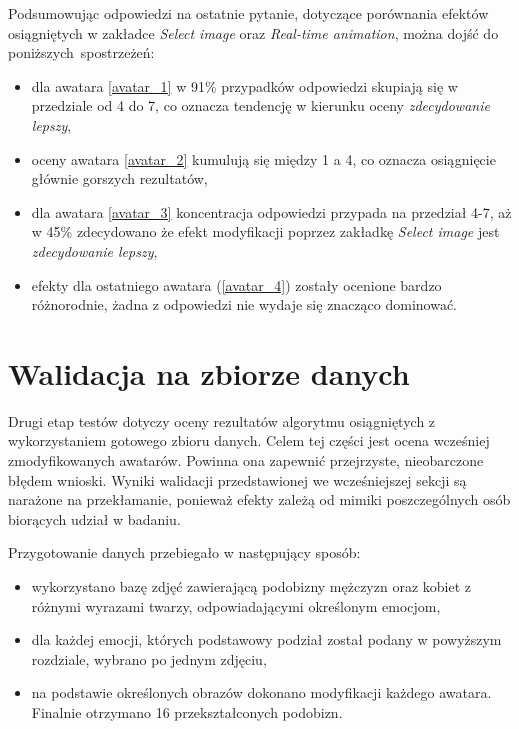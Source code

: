 Podsumowując odpowiedzi na ostatnie pytanie, dotyczące porównania efektów osiągniętych w zakładce \textit{Select image} oraz \textit{Real-time animation}, można dojść do poniższych~{spostrzeżeń}:
\begin{itemize}
    \item dla awatara \ref{avatar_1} w 91\% przypadków odpowiedzi skupiają się w przedziale od 4 do 7, co oznacza tendencję w kierunku oceny \textit{zdecydowanie lepszy},
    \item oceny awatara \ref{avatar_2} kumulują się między 1 a 4, co oznacza osiągnięcie głównie gorszych rezultatów,
    \item dla awatara \ref{avatar_3} koncentracja odpowiedzi przypada na przedział 4-7, aż w 45\% zdecydowano że efekt modyfikacji poprzez zakładkę \textit{Select image} jest \textit{zdecydowanie lepszy},
    \item efekty dla ostatniego awatara (\ref{avatar_4}) zostały ocenione bardzo różnorodnie, żadna z odpowiedzi nie wydaje się znacząco dominować.
\end{itemize}



\section{Walidacja na zbiorze danych}
Drugi etap testów dotyczy oceny rezultatów algorytmu osiągniętych z wykorzystaniem gotowego zbioru danych. Celem tej części jest ocena wcześniej zmodyfikowanych awatarów. Powinna ona zapewnić przejrzyste, nieobarczone błędem wnioski. Wyniki walidacji przedstawionej we wcześniejszej sekcji są narażone na przekłamanie, ponieważ efekty zależą od mimiki poszczególnych osób biorących udział w badaniu.

Przygotowanie danych przebiegało w następujący sposób:
\begin{itemize}
    \item wykorzystano bazę zdjęć zawierającą podobizny mężczyzn oraz kobiet z różnymi wyrazami twarzy, odpowiadającymi określonym emocjom,
    \item dla każdej emocji, których podstawowy podział został podany w powyższym rozdziale, wybrano po jednym zdjęciu,
    \item na podstawie określonych obrazów dokonano modyfikacji każdego awatara. Finalnie otrzymano 16 przekształconych podobizn.
\end{itemize}

